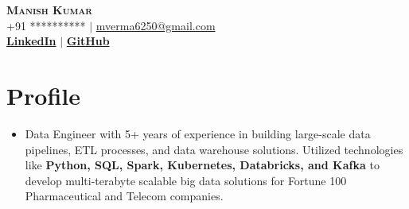 \documentclass[letterpaper,11pt]{article}
\begin{document}




\begin{center}
    \textbf{\Huge \scshape Manish Kumar} \\ \vspace{1pt}
    \small +91 ********** $|$ \href{mailto:mverma6250@gmail.com}{{mverma6250@gmail.com}}    \\ 
    \small  
    \href{https://www.linkedin.com/in/manish-kumar-373b86176/}{\bf LinkedIn} $|$
    \href{https://github.com/manisnitt}{\bf GitHub} 
    
\end{center}



\section{Profile}
\begin{itemize}[leftmargin=0.15in, label={}]
\item 
Data Engineer with 5+ years of experience in building large-scale data pipelines, ETL processes, and data warehouse solutions. Utilized technologies like \textbf{Python, SQL, Spark, Kubernetes, Databricks, and Kafka} to develop multi-terabyte scalable big data solutions for Fortune 100 Pharmaceutical and Telecom companies.
\end{itemize}
\end{document}
